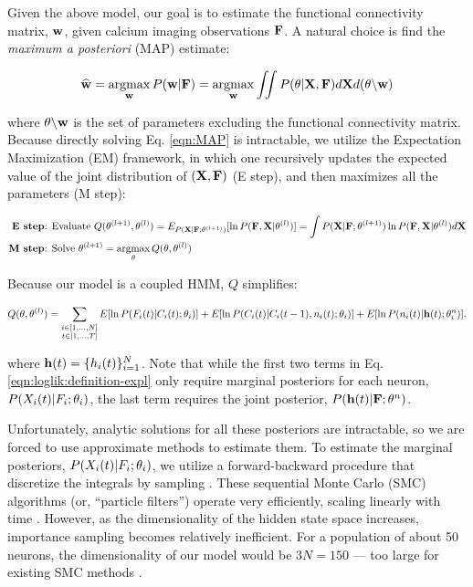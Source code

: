 Given the above model, our goal is to estimate the functional connectivity matrix, $\mathbf{w}$, given calcium imaging observations ${\bf F}$. A natural choice is find the \emph{maximum a posteriori} (MAP) estimate:

\begin{equation}\label{eqn:MAP}
\widehat{\mathbf{w}}=\operatorname*{argmax}_{\mathbf{w}} P(\mathbf{w}| {\bf F}) = \operatorname*{argmax}_{\mathbf{w}} \iint P(\mathbf{\theta}| {\bf X}, {\bf F}) d{\bf X} d(\mathbf{\theta} \backslash \mathbf{w})
\end{equation}

\noindent where $\mathbf{\theta} \backslash \mathbf{w}$ is the set of parameters excluding the functional connectivity matrix.  Because directly solving Eq. \eqref{eqn:MAP} is intractable, we utilize the Expectation Maximization (EM) framework, in which one recursively updates the expected value of the joint distribution of $({\bf X}, {\bf F})$ (E step), and then maximizes all the parameters (M step):

\begin{align*}
\textbf{E step} &\text{: Evaluate } Q(\mathbf{\theta}^{(l+1)},\mathbf{\theta}^{(l)}) = E_{P({\bf X} | {\bf F}; \mathbf{\theta}^{(l+1)})}[ \ln P({\bf F}, {\bf X} | \mathbf{\theta}^{(l)})] = \int P({\bf X} | {\bf F}; \mathbf{\theta}^{(l+1)}) \ln P({\bf F}, {\bf X} | \mathbf{\theta}^{(l)}) d {\bf X}  \\
\textbf{M step} &\text{: Solve } \mathbf{\theta}^{(l+1)} = \operatorname*{argmax}_{\mathbf{\theta}} Q(\mathbf{\theta},\mathbf{\theta}^{(l)})  
\end{align*}

Because our model is a coupled HMM, $Q$ simplifies:

\begin{equation}\label{eqn:loglik:definition-expl}
Q(\mathbf{\theta},\mathbf{\theta}^{(l)}) = 
\sum_{\substack{i \in [1,\ldots,N] \\ t \in [1,\ldots, T]}} E[\ln P(F_i(t)|C_i(t); \mathbf{\theta}_i)] + 
E[\ln P(C_i(t)|C_i(t-1), n_i(t); \mathbf{\theta}_i)] + 
E[\ln P(n_i(t)| \mathbf{h}(t); \mathbf{\theta}^n_i)].
\end{equation}

\noindent where $\mathbf{h}(t)=\{h_i(t)\}_{i=1}^N$.  Note that while the first two terms in Eq. \eqref{eqn:loglik:definition-expl} only require marginal posteriors for each neuron, $P(X_i(t) | F_i; \mathbf{\theta}_i)$, the last term requires the joint posterior, $P(\mathbf{h}(t) | {\bf F}; \mathbf{\theta}^n)$.  

Unfortunately, analytic solutions for all these posteriors are intractable, so we are forced to use approximate methods to estimate them.  To estimate the marginal posteriors, $P(X_i(t) | F_i; \mathbf{\theta}_i)$, we utilize a forward-backward procedure that discretize the integrals by sampling \cite{DFG01, MINKAPHD, Fearnhead2003, koyama08, Andrieu2007, NBR03}.  These sequential Monte Carlo (SMC) algorithms (or, ``particle filters'') operate very efficiently, scaling linearly with time \cite{RAB89}. However, as the dimensionality of the hidden state space increases, importance sampling becomes relatively inefficient.  For a population of about 50 neurons, the dimensionality of our model would be $3N=150$ --- too large for existing SMC methods \cite{??}.  

